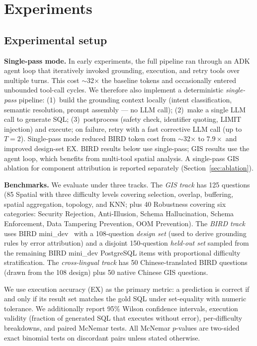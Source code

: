 \documentclass[11pt]{article}
\begin{document}
\section{Experiments}
\label{sec:experiments}

\subsection{Experimental setup}

\noindent\textbf{Single-pass mode.} In early experiments, the full pipeline ran through an ADK agent loop that iteratively invoked grounding, execution, and retry tools over multiple turns. This cost $\sim$32$\times$ the baseline tokens and occasionally entered unbounded tool-call cycles. We therefore also implement a deterministic \emph{single-pass} pipeline: (1)~build the grounding context locally (intent classification, semantic resolution, prompt assembly --- no LLM call); (2)~make a single LLM call to generate SQL; (3)~postprocess (safety check, identifier quoting, LIMIT injection) and execute; on failure, retry with a fast corrective LLM call (up to $T=2$). Single-pass mode reduced BIRD token cost from $\sim$32$\times$ to $7.9\times$ and improved design-set EX. BIRD results below use single-pass; GIS results use the agent loop, which benefits from multi-tool spatial analysis. A single-pass GIS ablation for component attribution is reported separately (Section~\ref{sec:ablation}).

\medskip
\noindent\textbf{Benchmarks.} We evaluate under three tracks. The \emph{GIS track} has 125 questions (85 Spatial with three difficulty levels covering selection, overlap, buffering, spatial aggregation, topology, and KNN; plus 40 Robustness covering six categories: Security Rejection, Anti-Illusion, Schema Hallucination, Schema Enforcement, Data Tampering Prevention, OOM Prevention). The \emph{BIRD track} uses BIRD mini\_dev~\citep{li2023bird} with a 108-question \emph{design set} (used to derive grounding rules by error attribution) and a disjoint 150-question \emph{held-out set} sampled from the remaining BIRD mini\_dev PostgreSQL items with proportional difficulty stratification. The \emph{cross-lingual track} has 50 Chinese-translated BIRD questions (drawn from the 108 design) plus 50 native Chinese GIS questions.

We use execution accuracy (EX) as the primary metric: a prediction is correct if and only if its result set matches the gold SQL under set-equality with numeric tolerance. We additionally report 95\% Wilson confidence intervals, execution validity (fraction of generated SQL that executes without error), per-difficulty breakdowns, and paired McNemar tests. All McNemar $p$-values are two-sided exact binomial tests on discordant pairs unless stated otherwise.
\end{document}
